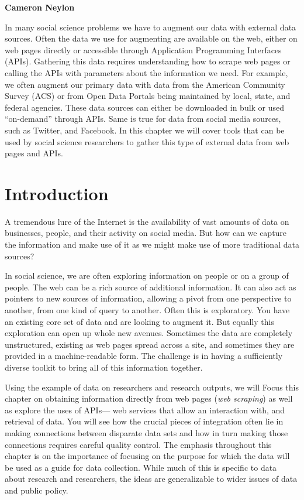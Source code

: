 \documentclass[]{krantz}
\begin{document}
\textbf{Cameron Neylon}

In many social science problems we have to augment our data with
external data sources. Often the data we use for augmenting are
available on the web, either on web pages directly or accessible through
Application Programming Interfaces (APIs). Gathering this data requires
understanding how to scrape web pages or calling the APIs with
parameters about the information we need. For example, we often augment
our primary data with data from the American Community Survey (ACS) or
from Open Data Portals being maintained by local, state, and federal
agencies. These data sources can either be downloaded in bulk or used
``on-demand'' through APIs. Same is true for data from social media
sources, such as Twitter, and Facebook. In this chapter we will cover
tools that can be used by social science researchers to gather this type
of external data from web pages and APIs.

\section{Introduction}\label{introduction}

A tremendous lure of the Internet is the availability of vast amounts of
data on businesses, people, and their activity on social media. But how
can we capture the information and make use of it as we might make use
of more traditional data sources?

In social science, we are often exploring information on people or on a
group of people. The web can be a rich source of additional information.
It can also act as pointers to new sources of information, allowing a
pivot from one perspective to another, from one kind of query to
another. Often this is exploratory. You have an existing core set of
data and are looking to augment it. But equally this exploration can
open up whole new avenues. Sometimes the data are completely
unstructured, existing as web pages spread across a site, and sometimes
they are provided in a machine-readable form. The challenge is in having
a sufficiently diverse toolkit to bring all of this information
together.

Using the example of data on researchers and research outputs, we will
Focus this chapter on obtaining information directly from web pages
(\emph{web scraping}) as well as explore the uses of APIs--- web
services that allow an interaction with, and retrieval of data. You will
see how the crucial pieces of integration often lie in making
connections between disparate data sets and how in turn making those
connections requires careful quality control. The emphasis throughout
this chapter is on the importance of focusing on the purpose for which
the data will be used as a guide for data collection. While much of this
is specific to data about research and researchers, the ideas are
generalizable to wider issues of data and public policy.
\end{document}
